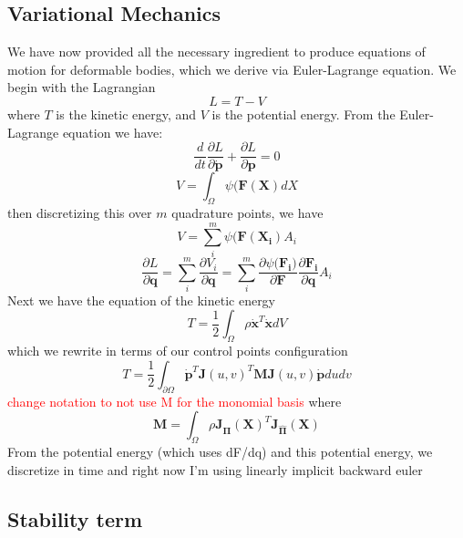 \documentclass[sigconf]{acmart}
\newcommand\myworries[1]{\textcolor{red}{#1}}
\begin{document}
\subsection{Variational Mechanics}
We have now provided all the necessary ingredient to produce equations of motion for deformable bodies, which we derive via Euler-Lagrange equation. We begin with the Lagrangian
\begin{equation}
    L=T-V
\end{equation}
where $T$ is the kinetic energy, and $V$ is the potential energy. From the Euler-Lagrange equation we have:
\begin{equation}
    \frac{d}{dt} \frac{\partial L}{\partial \dot{\mathbf{p}}} + \frac{\partial L}{\partial {\mathbf{p}}} = 0
\end{equation}
\begin{equation}
    V =  \int_\Omega \psi(\mathbf{F(X)} dX
\end{equation}
then discretizing this over $m$ quadrature points, we have
\begin{equation}
    V =  \sum_i^m \psi(\mathbf{F(X_i)} A_i
\end{equation}
\begin{equation}
    \frac{\partial L}{\partial \mathbf{q}} = \sum_i^m \frac{\partial V_i}{\partial \mathbf{q}} = \sum_i^m \frac{\partial \psi(\mathbf{F_i)}}{\partial \mathbf{F}}\frac{\partial \mathbf{F_i}}{\partial \mathbf{q}}A_i
\end{equation}
Next we have the equation of the kinetic energy
\begin{equation}
    T = \frac{1}{2}\int_{ \Omega} \rho \dot{\mathbf{x}}^T\dot{\mathbf{x}} dV
\end{equation}
which we rewrite in terms of our control points configuration
\begin{equation}
    T = \frac{1}{2} \int_{\partial \Omega} \dot{\mathbf{p}}^T \mathbf{J}(u,v)^T \mathbf{M} \mathbf{J}(u,v) \dot{\mathbf{p}} du dv
\end{equation}
\myworries{change notation to not use M for the monomial basis}
where
\begin{equation}
    \mathbf{M} = \int_\Omega \rho \mathbf{J_{\hat{\Pi}}(X)}^T \mathbf{J_{\hat{\Pi}}(X)}
\end{equation}
From the potential energy (which uses dF/dq) and this potential energy, we discretize in time and right now I'm using linearly implicit backward euler

\subsection{Stability term}
\end{document}
